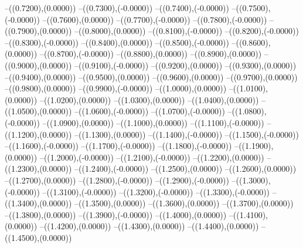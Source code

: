 {	--({\sx*(0.7200)},{\sy*(0.0000)})
	--({\sx*(0.7300)},{\sy*(-0.0000)})
	--({\sx*(0.7400)},{\sy*(-0.0000)})
	--({\sx*(0.7500)},{\sy*(-0.0000)})
	--({\sx*(0.7600)},{\sy*(0.0000)})
	--({\sx*(0.7700)},{\sy*(-0.0000)})
	--({\sx*(0.7800)},{\sy*(-0.0000)})
	--({\sx*(0.7900)},{\sy*(0.0000)})
	--({\sx*(0.8000)},{\sy*(0.0000)})
	--({\sx*(0.8100)},{\sy*(-0.0000)})
	--({\sx*(0.8200)},{\sy*(-0.0000)})
	--({\sx*(0.8300)},{\sy*(-0.0000)})
	--({\sx*(0.8400)},{\sy*(0.0000)})
	--({\sx*(0.8500)},{\sy*(-0.0000)})
	--({\sx*(0.8600)},{\sy*(0.0000)})
	--({\sx*(0.8700)},{\sy*(-0.0000)})
	--({\sx*(0.8800)},{\sy*(0.0000)})
	--({\sx*(0.8900)},{\sy*(0.0000)})
	--({\sx*(0.9000)},{\sy*(0.0000)})
	--({\sx*(0.9100)},{\sy*(-0.0000)})
	--({\sx*(0.9200)},{\sy*(0.0000)})
	--({\sx*(0.9300)},{\sy*(0.0000)})
	--({\sx*(0.9400)},{\sy*(0.0000)})
	--({\sx*(0.9500)},{\sy*(0.0000)})
	--({\sx*(0.9600)},{\sy*(0.0000)})
	--({\sx*(0.9700)},{\sy*(0.0000)})
	--({\sx*(0.9800)},{\sy*(0.0000)})
	--({\sx*(0.9900)},{\sy*(-0.0000)})
	--({\sx*(1.0000)},{\sy*(0.0000)})
	--({\sx*(1.0100)},{\sy*(0.0000)})
	--({\sx*(1.0200)},{\sy*(0.0000)})
	--({\sx*(1.0300)},{\sy*(0.0000)})
	--({\sx*(1.0400)},{\sy*(0.0000)})
	--({\sx*(1.0500)},{\sy*(0.0000)})
	--({\sx*(1.0600)},{\sy*(-0.0000)})
	--({\sx*(1.0700)},{\sy*(-0.0000)})
	--({\sx*(1.0800)},{\sy*(-0.0000)})
	--({\sx*(1.0900)},{\sy*(0.0000)})
	--({\sx*(1.1000)},{\sy*(0.0000)})
	--({\sx*(1.1100)},{\sy*(-0.0000)})
	--({\sx*(1.1200)},{\sy*(0.0000)})
	--({\sx*(1.1300)},{\sy*(0.0000)})
	--({\sx*(1.1400)},{\sy*(-0.0000)})
	--({\sx*(1.1500)},{\sy*(-0.0000)})
	--({\sx*(1.1600)},{\sy*(-0.0000)})
	--({\sx*(1.1700)},{\sy*(-0.0000)})
	--({\sx*(1.1800)},{\sy*(-0.0000)})
	--({\sx*(1.1900)},{\sy*(0.0000)})
	--({\sx*(1.2000)},{\sy*(-0.0000)})
	--({\sx*(1.2100)},{\sy*(-0.0000)})
	--({\sx*(1.2200)},{\sy*(0.0000)})
	--({\sx*(1.2300)},{\sy*(0.0000)})
	--({\sx*(1.2400)},{\sy*(-0.0000)})
	--({\sx*(1.2500)},{\sy*(0.0000)})
	--({\sx*(1.2600)},{\sy*(0.0000)})
	--({\sx*(1.2700)},{\sy*(0.0000)})
	--({\sx*(1.2800)},{\sy*(-0.0000)})
	--({\sx*(1.2900)},{\sy*(-0.0000)})
	--({\sx*(1.3000)},{\sy*(-0.0000)})
	--({\sx*(1.3100)},{\sy*(-0.0000)})
	--({\sx*(1.3200)},{\sy*(-0.0000)})
	--({\sx*(1.3300)},{\sy*(-0.0000)})
	--({\sx*(1.3400)},{\sy*(0.0000)})
	--({\sx*(1.3500)},{\sy*(0.0000)})
	--({\sx*(1.3600)},{\sy*(0.0000)})
	--({\sx*(1.3700)},{\sy*(0.0000)})
	--({\sx*(1.3800)},{\sy*(0.0000)})
	--({\sx*(1.3900)},{\sy*(-0.0000)})
	--({\sx*(1.4000)},{\sy*(0.0000)})
	--({\sx*(1.4100)},{\sy*(0.0000)})
	--({\sx*(1.4200)},{\sy*(0.0000)})
	--({\sx*(1.4300)},{\sy*(0.0000)})
	--({\sx*(1.4400)},{\sy*(0.0000)})
	--({\sx*(1.4500)},{\sy*(0.0000)})
}
